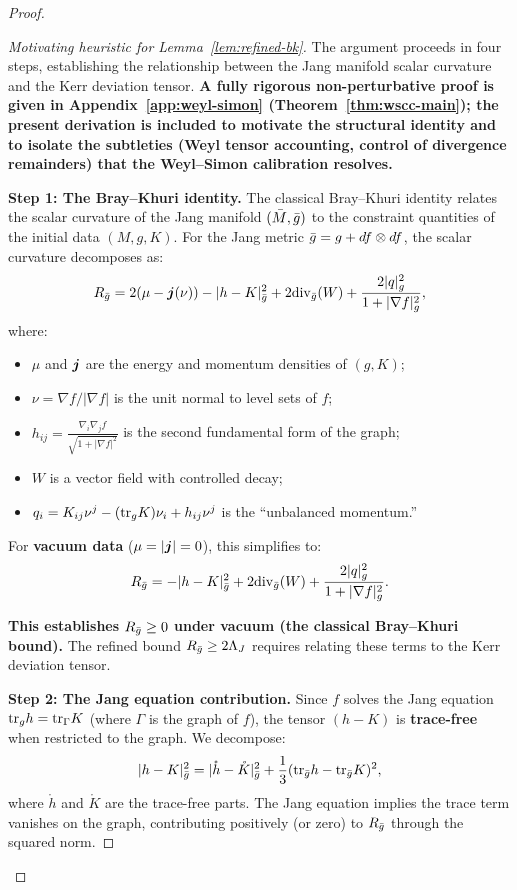 \begin{proof}
\begin{proof}[Motivating heuristic for Lemma~\ref{lem:refined-bk}]
The argument proceeds in four steps, establishing the relationship between the Jang manifold scalar curvature and the Kerr deviation tensor. \textbf{A fully rigorous non-perturbative proof is given in Appendix~\ref{app:weyl-simon} (Theorem~\ref{thm:wscc-main}); the present derivation is included to motivate the structural identity and to isolate the subtleties (Weyl tensor accounting, control of divergence remainders) that the Weyl--Simon calibration resolves.}

\textbf{Step 1: The Bray--Khuri identity.}
The classical Bray--Khuri identity \cite[Theorem 2.1]{braykhuri2010} relates the scalar curvature of the Jang manifold $(\bar{M}, \bar{g})$ to the constraint quantities of the initial data $(M, g, K)$. For the Jang metric $\bar{g} = g + df \otimes df$, the scalar curvature decomposes as:
\begin{equation}\label{eq:bk-identity}
R_{\bar{g}} = 2(\mu - \boldsymbol{j}(\nu)) - |h - K|^2_{\bar{g}} + 2\mathrm{div}_{\bar{g}}(W) + \frac{2|q|^2_g}{1 + |\nabla f|^2_g},
\end{equation}
where:
\begin{itemize}
    \item $\mu$ and $\boldsymbol{j}$ are the energy and momentum densities of $(g, K)$;
    \item $\nu = \nabla f / |\nabla f|$ is the unit normal to level sets of $f$;
    \item $h_{ij} = \frac{\nabla_i \nabla_j f}{\sqrt{1 + |\nabla f|^2}}$ is the second fundamental form of the graph;
    \item $W$ is a vector field with controlled decay;
    \item $q_i = K_{ij}\nu^j - (\mathrm{tr}_g K)\nu_i + h_{ij}\nu^j$ is the ``unbalanced momentum.''
\end{itemize}

For \textbf{vacuum data} ($\mu = |\boldsymbol{j}| = 0$), this simplifies to:
\begin{equation}\label{eq:bk-vacuum}
R_{\bar{g}} = -|h - K|^2_{\bar{g}} + 2\mathrm{div}_{\bar{g}}(W) + \frac{2|q|^2_g}{1 + |\nabla f|^2_g}.
\end{equation}

\textbf{This establishes $R_{\bar{g}} \geq 0$ under vacuum (the classical Bray--Khuri bound).} The refined bound $R_{\bar{g}} \geq 2\Lambda_J$ requires relating these terms to the Kerr deviation tensor.

\textbf{Step 2: The Jang equation contribution.}
Since $f$ solves the Jang equation $\mathrm{tr}_g h = \mathrm{tr}_\Gamma K$ (where $\Gamma$ is the graph of $f$), the tensor $(h - K)$ is \textbf{trace-free} when restricted to the graph. We decompose:
\[
|h - K|^2_{\bar{g}} = |\mathring{h} - \mathring{K}|^2_{\bar{g}} + \frac{1}{3}(\mathrm{tr}_{\bar{g}} h - \mathrm{tr}_{\bar{g}} K)^2,
\]
where $\mathring{h}$ and $\mathring{K}$ are the trace-free parts. The Jang equation implies the trace term vanishes on the graph, contributing positively (or zero) to $R_{\bar{g}}$ through the squared norm.


\end{proof}
\end{proof}
